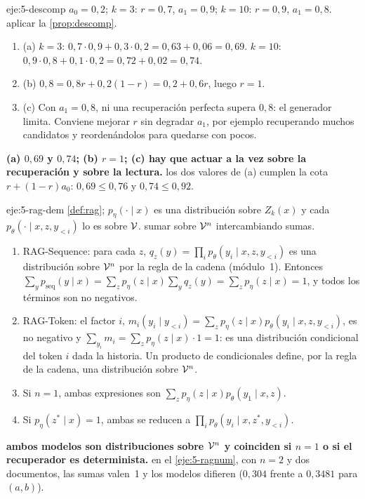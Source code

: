\begin{solucion}{eje:5-descomp}
\datos $a_0=0{,}2$; $k=3$: $r=0{,}7$, $a_1=0{,}9$; $k=10$: $r=0{,}9$, $a_1=0{,}8$.
\planteamiento aplicar la \cref{prop:descomp}.
\pasos
\begin{enumerate}[label=\arabic*.]
  \item (a) $k=3$: $0{,}7\cdot 0{,}9+0{,}3\cdot 0{,}2=0{,}63+0{,}06=0{,}69$. $k=10$: $0{,}9\cdot 0{,}8+0{,}1\cdot 0{,}2=0{,}72+0{,}02=0{,}74$.
  \item (b) $0{,}8=0{,}8r+0{,}2(1-r)=0{,}2+0{,}6r$, luego $r=1$.
  \item (c) Con $a_1=0{,}8$, ni una recuperación perfecta supera $0{,}8$: el generador limita. Conviene mejorar $r$ sin degradar $a_1$, por ejemplo recuperando muchos candidatos y reordenándolos para quedarse con pocos.
\end{enumerate}
\resultado \textbf{(a) $0{,}69$ y $0{,}74$; (b) $r=1$; (c) hay que actuar a la vez sobre la recuperación y sobre la lectura.}
\comprobacion los dos valores de (a) cumplen la cota $r+(1-r)a_0$: $0{,}69\le 0{,}76$ y $0{,}74\le 0{,}92$.
\end{solucion}

\begin{solucion}{eje:5-rag-dem}
\datos \cref{def:rag}; $p_\eta(\cdot\mid x)$ es una distribución sobre $Z_k(x)$ y cada $p_\theta(\cdot\mid x,z,y_{<i})$ lo es sobre $\mathcal{V}$.
\planteamiento sumar sobre $\mathcal{V}^{n}$ intercambiando sumas.
\pasos
\begin{enumerate}[label=\arabic*.]
  \item RAG-Sequence: para cada $z$, $q_z(y)=\prod_i p_\theta(y_i\mid x,z,y_{<i})$ es una distribución sobre $\mathcal{V}^{n}$ por la regla de la cadena (módulo~1). Entonces $\sum_y p_{\mathrm{seq}}(y\mid x)=\sum_z p_\eta(z\mid x)\sum_y q_z(y)=\sum_z p_\eta(z\mid x)=1$, y todos los términos son no negativos.
  \item RAG-Token: el factor $i$, $m_i(y_i\mid y_{<i})=\sum_z p_\eta(z\mid x)p_\theta(y_i\mid x,z,y_{<i})$, es no negativo y $\sum_{y_i}m_i=\sum_z p_\eta(z\mid x)\cdot 1=1$: es una distribución condicional del token $i$ dada la historia. Un producto de condicionales define, por la regla de la cadena, una distribución sobre $\mathcal{V}^{n}$.
  \item Si $n=1$, ambas expresiones son $\sum_z p_\eta(z\mid x)p_\theta(y_1\mid x,z)$.
  \item Si $p_\eta(z^\ast\mid x)=1$, ambas se reducen a $\prod_i p_\theta(y_i\mid x,z^\ast,y_{<i})$.
\end{enumerate}
\resultado \textbf{ambos modelos son distribuciones sobre $\mathcal{V}^{n}$ y coinciden si $n=1$ o si el recuperador es determinista.}
\comprobacion en el \cref{eje:5-ragnum}, con $n=2$ y dos documentos, las sumas valen~1 y los modelos difieren ($0{,}304$ frente a $0{,}3481$ para $(a,b)$).
\end{solucion}

